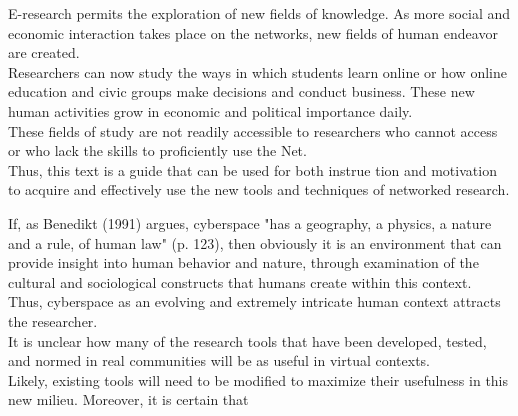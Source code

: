 \documentclass{beamer}
\begin{document}
 
 
\begin{frame}
E-research permits the exploration of new fields of knowledge. As more social and economic
interaction takes place on the networks, new fields of human endeavor are created.\\
Researchers can now study the ways in which students learn online or how online education
and civic groups make decisions and conduct business. These new human activities
grow in economic and political importance daily. \\
These fields of study are not readily
accessible to researchers who cannot access or who lack the skills to proficiently use the
Net. \\
Thus, this text is a guide that can be used for both instrue tion and motivation to
acquire and effectively use the new tools and techniques of networked research.
 \end{frame}
 
 
 
\begin{frame}
 If, as Benedikt (1991) argues, cyberspace "has a geography, a physics, a nature and a
rule, of human law" (p. 123), then obviously it is an environment that can provide insight
into human behavior and nature, through examination of the cultural and sociological
constructs that humans create within this context.\\
 Thus, cyberspace as an evolving and
extremely intricate human context attracts the researcher. \\
It is unclear how many of the
research tools that have been developed, tested, and normed in real communities will be
as useful in virtual contexts.\\
 Likely, existing tools will need to be modified to maximize
their usefulness in this new milieu. Moreover, it is certain that
 \end{frame}
 
 
 
\end{document}
